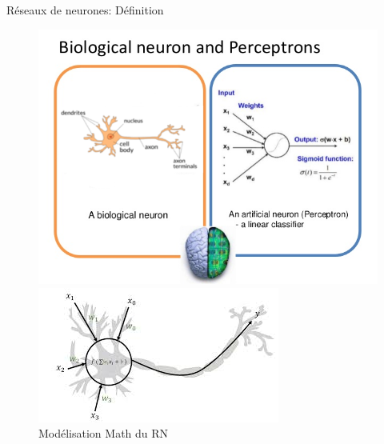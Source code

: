 \documentclass{beamer}
\begin{document}
\begin{frame}{Réseaux de neurones: Définition}
	
	\begin{figure}[h]
		\centering
		\begin{minipage}{0.5\textwidth}
			\centering
			\includegraphics[width=\linewidth]{brain.png}
			\caption{Reseau de neurone biologique vs Perceptron}
		\end{minipage}\hfill
		\begin{minipage}{0.5\textwidth}
			\centering
			\includegraphics[width=\linewidth]{RNN-BIO-Math.jpeg}
			\caption{Modélisation Math du RN }
		\end{minipage}
	\end{figure}
\end{frame}	
\end{document}

